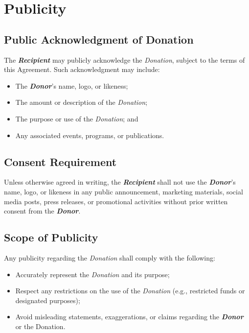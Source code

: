 
\section{Publicity}
\label{sec:publicity}

\subsection{Public Acknowledgment of Donation}
The \textbf{\textit{Recipient}} may publicly acknowledge the \textit{Donation}, subject to the terms of this Agreement. Such acknowledgment may include:
\begin{itemize}
  \item The \textbf{\textit{Donor}}’s name, logo, or likeness;
  \item The amount or description of the \textit{Donation};
  \item The purpose or use of the \textit{Donation}; and
  \item Any associated events, programs, or publications.
\end{itemize}

\subsection{Consent Requirement}
Unless otherwise agreed in writing, the \textbf{\textit{Recipient}} shall not use the \textbf{\textit{Donor}}’s name, logo, or likeness in any public announcement, marketing materials, social media posts, press releases, or promotional activities without prior written consent from the \textbf{\textit{Donor}}.

\subsection{Scope of Publicity}
Any publicity regarding the \textit{Donation} shall comply with the following:
\begin{itemize}
  \item Accurately represent the \textit{Donation} and its purpose;
  \item Respect any restrictions on the use of the \textit{Donation} (e.g., restricted funds or designated purposes);
  \item Avoid misleading statements, exaggerations, or claims regarding the \textbf{\textit{Donor}} or the Donation.
\end{itemize}


